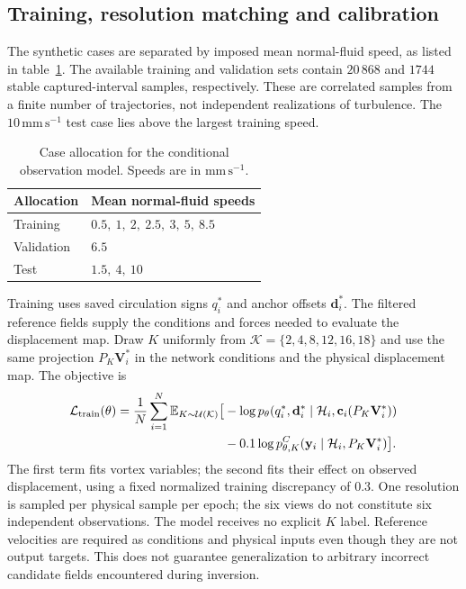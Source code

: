 \documentclass[11pt]{article}
\numberwithin{equation}{section}
\begin{document}
\subsection{Training, resolution matching and calibration}
\label{sec:training}

The synthetic cases are separated by imposed mean normal-fluid speed, as listed in table~\ref{tab:split}. The available training and validation sets contain $20\,868$ and $1744$ stable captured-interval samples, respectively. These are correlated samples from a finite number of trajectories, not independent realizations of turbulence. The $10\,\mathrm{mm\,s^{-1}}$ test case lies above the largest training speed.
\begin{table}[htbp]
 \centering
 \caption{Case allocation for the conditional observation model. Speeds are in $\mathrm{mm\,s^{-1}}$.}
 \label{tab:split}
 \begin{tabular}{ll}
 \toprule
 Allocation & Mean normal-fluid speeds\\
 \midrule
 Training & $0.5,\ 1,\ 2,\ 2.5,\ 3,\ 5,\ 8.5$\\
 Validation & $6.5$\\
 Test & $1.5,\ 4,\ 10$\\
 \bottomrule
 \end{tabular}
\end{table}

Training uses saved circulation signs $q_i^*$ and anchor offsets $\mathbf d_i^*$. The filtered reference fields supply the conditions and forces needed to evaluate the displacement map. Draw $K$ uniformly from $\mathcal K=\{2,4,8,12,16,18\}$ and use the same projection $P_K\mathbf V_i^*$ in the network conditions and the physical displacement map. The objective is
\begin{equation}
 \begin{split}
 \mathcal L_{\rm train}(\theta)=\frac1N\sum_{i=1}^N
 \mathbb E_{K\sim\mathcal U(\mathcal K)}\big[&
 -\log p_\theta(q_i^*,\mathbf d_i^*\mid
                  \mathcal H_i,\mathbf c_i(P_K\mathbf V_i^*))\\
 &-0.1\log p_{\theta,K}^C(\mathbf y_i\mid
                  \mathcal H_i,P_K\mathbf V_i^*)\big].
 \end{split}
 \label{eq:trainingloss}
\end{equation}
The first term fits vortex variables; the second fits their effect on observed displacement, using a fixed normalized training discrepancy of $0.3$. One resolution is sampled per physical sample per epoch; the six views do not constitute six independent observations. The model receives no explicit $K$ label. Reference velocities are required as conditions and physical inputs even though they are not output targets. This does not guarantee generalization to arbitrary incorrect candidate fields encountered during inversion.
\end{document}
